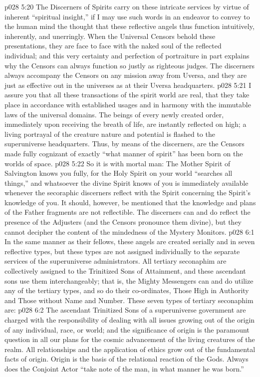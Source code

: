 \vs p028 5:20 The Discerners of Spirits carry on these intricate services by virtue of inherent “spiritual insight,” if I may use such words in an endeavor to convey to the human mind the thought that these reflective angels thus function intuitively, inherently, and unerringly. When the Universal Censors behold these presentations, they are face to face with the naked soul of the reflected individual; and this very certainty and perfection of portraiture in part explains why the Censors can always function so justly as righteous judges. The discerners always accompany the Censors on any mission away from Uversa, and they are just as effective out in the universes as at their Uversa headquarters.
\vs p028 5:21 I assure you that all these transactions of the spirit world are real, that they take place in accordance with established usages and in harmony with the immutable laws of the universal domains. The beings of every newly created order, immediately upon receiving the breath of life, are instantly reflected on high; a living portrayal of the creature nature and potential is flashed to the superuniverse headquarters. Thus, by means of the discerners, are the Censors made fully cognizant of exactly “what manner of spirit” has been born on the worlds of space.
\vs p028 5:22 So it is with mortal man: The Mother Spirit of Salvington knows you fully, for the Holy Spirit on your world “searches all things,” and whatsoever the divine Spirit knows of you is immediately available whenever the secoraphic discerners reflect with the Spirit concerning the Spirit’s knowledge of you. It should, however, be mentioned that the knowledge and plans of the Father fragments are not reflectible. The discerners can and do reflect the presence of the Adjusters (and the Censors pronounce them divine), but they cannot decipher the content of the mindedness of the Mystery Monitors.
\vs p028 6:1 In the same manner as their fellows, these angels are created serially and in seven reflective types, but these types are not assigned individually to the separate services of the superuniverse administrators. All tertiary seconaphim are collectively assigned to the Trinitized Sons of Attainment, and these ascendant sons use them interchangeably; that is, the Mighty Messengers can and do utilize any of the tertiary types, and so do their co\hyp{}ordinates, Those High in Authority and Those without Name and Number. These seven types of tertiary seconaphim are:
\pc \vs p028 6:2 \bibnobreakspace {} The ascendant Trinitized Sons of a superuniverse government are charged with the responsibility of dealing with all issues growing out of the origin of any individual, race, or world; and the significance of origin is the paramount question in all our plans for the cosmic advancement of the living creatures of the realm. All relationships and the application of ethics grow out of the fundamental facts of origin. Origin is the basis of the relational reaction of the Gods. Always does the Conjoint Actor “take note of the man, in what manner he was born.”
